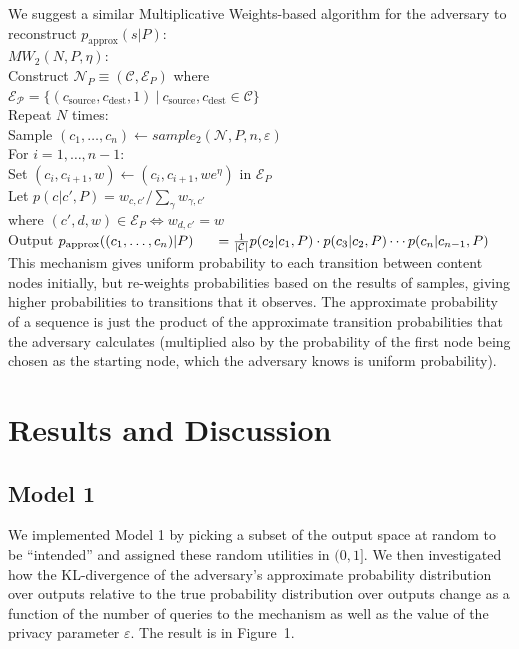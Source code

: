 \documentclass[preprint2]{aastex}
\begin{document}
We suggest a similar Multiplicative Weights-based algorithm for the adversary to reconstruct \(p_\text{approx}(s|P)\): \\

\noindent \(MW_2(N, P, \eta):\)\\
\indent Construct \(\mathcal{N}_P \equiv (\mathcal{C}, \mathcal{E}_P)\) where \\
\indent  \(\mathcal{E_P} = \{(c_\text{source}, c_\text{dest}, 1) \ | \ c_\text{source}, c_\text{dest} \in \mathcal{C}\}\) \\
\indent Repeat \(N\) times:\\
\indent \indent Sample \((c_1, \dots, c_n) \leftarrow sample_2(\mathcal{N}, P, n, \varepsilon)\) \\
\indent \indent For \(i = 1, \dots, n-1\): \\
\indent \indent \indent Set \((c_i, c_{i+1}, w) \leftarrow (c_i, c_{i+1}, we^\eta)\) in \(\mathcal{E}_P\)\\
\indent Let \(p(c|c',P) = w_{c, c'} / \sum_\gamma w_{\gamma, c'}\)\\
\indent where \((c', d, w) \in \mathcal{E}_P \Leftrightarrow w_{d, c'} = w\) \\
\indent Output \(p_\text{approx}((c_1, \dots, c_n) | P) \\
\indent = \frac{1}{|\mathcal{C}|} p(c_2|c_1,P) \cdot p(c_3|c_2,P) \cdots p(c_n | c_{n-1}, P)\) \\

This mechanism gives uniform probability to each transition between content nodes initially, but re-weights probabilities based on the results of samples, giving higher probabilities to transitions that it observes. The approximate probability of a sequence is just the product of the approximate transition probabilities that the adversary calculates (multiplied also by the probability of the first node being chosen as the starting node, which the adversary knows is uniform probability).

\section {Results and Discussion}

\subsection{Model 1}

We implemented Model 1 by picking a subset of the output space at random to be ``intended'' and assigned these random utilities in \((0,1].\) We then investigated how the KL-divergence of the adversary's approximate probability distribution over outputs relative to the true probability distribution over outputs change as a function of the number of queries to the mechanism as well as the value of the privacy parameter \(\varepsilon\). The result is in Figure~1.
\end{document}
